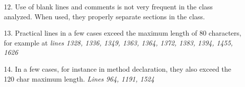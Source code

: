 \begin{itemize}
\item [12.] Use of blank lines and comments is not very frequent in the class analyzed. When used, they properly separate sections in the class.
\item [13.] Practical lines in a few cases exceed the maximum length of 80 characters, for example at \textit{lines 1328, 1336, 1349, 1363, 1364, 1372, 1383, 1394, 1455, 1626}
\item [14.] In a few cases, for instance in method declaration, they also exceed the 120 char maximum length. \textit{Lines 964, 1191, 1524}  

\end{itemize}